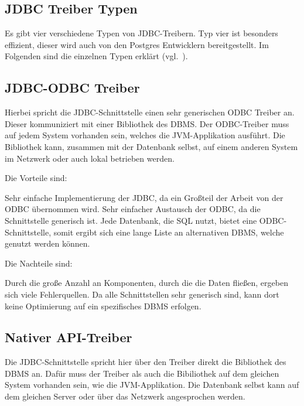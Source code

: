 \subsection{JDBC Treiber Typen}
Es gibt vier verschiedene Typen von JDBC\hyp{}Treibern. Typ vier ist besonders
effizient, dieser wird auch von den Postgres Entwicklern bereitgestellt. Im
Folgenden sind die einzelnen Typen erklärt (vgl.~\cite{jdbc-types}).
\tm%

\subsection{JDBC-ODBC Treiber}
Hierbei spricht die JDBC\hyp{}Schnittstelle einen sehr generischen \gls{ODBC}
Treiber an. Dieser kommuniziert mit einer Bibliothek des DBMS\@. Der
ODBC\hyp{}Treiber muss auf jedem System vorhanden sein, welches die
JVM\hyp{}Applikation ausführt. Die Bibliothek kann, zusammen mit der Datenbank
selbst, auf einem anderen System im Netzwerk oder auch lokal betrieben werden.

Die Vorteile sind:

\begin{outline}
  \1 Sehr einfache Implementierung der JDBC, da ein Großteil der Arbeit von
  der ODBC übernommen wird.
  \1 Sehr einfacher Austausch der ODBC, da die Schnittstelle generisch ist.
  \1 Jede Datenbank, die SQL nutzt, bietet eine ODBC\hyp{}Schnittstelle, somit
  ergibt sich eine lange Liste an alternativen DBMS, welche genutzt werden
  können.
\end{outline}

Die Nachteile sind:

\begin{outline}
  \1 Durch die große Anzahl an Komponenten, durch die die Daten fließen,
  ergeben sich viele Fehlerquellen.
  \1 Da alle Schnittstellen sehr generisch sind, kann dort keine Optimierung
  auf ein spezifisches DBMS erfolgen.
\end{outline}
\tm%

\subsection{Nativer API-Treiber}
Die JDBC\hyp{}Schnittstelle spricht hier über den Treiber direkt die Bibliothek
des DBMS an. Dafür muss der Treiber als auch die Bibiliothek auf dem gleichen
System vorhanden sein, wie die JVM\hyp{}Applikation. Die Datenbank selbst kann auf
dem gleichen Server oder über das Netzwerk angesprochen werden.


